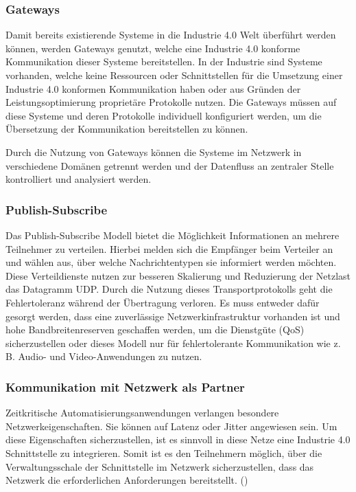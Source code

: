 \subsubsection{Gateways}
Damit bereits existierende Systeme in die Industrie 4.0 Welt überführt werden können, werden Gateways genutzt, welche eine Industrie 4.0 konforme Kommunikation dieser Systeme bereitstellen. In der Industrie sind Systeme vorhanden, welche keine Ressourcen oder Schnittstellen für die Umsetzung einer Industrie 4.0 konformen Kommunikation haben oder aus Gründen der Leistungsoptimierung proprietäre Protokolle nutzen. Die Gateways müssen auf diese Systeme und deren Protokolle individuell konfiguriert werden, um die Übersetzung der Kommunikation bereitstellen zu können.

Durch die Nutzung von Gateways können die Systeme im Netzwerk in verschiedene Domänen getrennt werden und der Datenfluss an zentraler Stelle kontrolliert und analysiert werden.

\subsubsection{Publish-Subscribe}
\label{Grundlagen:Publish-Subscribe}
Das Publish-Subscribe Modell bietet die Möglichkeit Informationen an mehrere Teilnehmer zu verteilen. Hierbei melden sich die Empfänger beim Verteiler an und wählen aus, über welche Nachrichtentypen sie informiert werden möchten. Diese Verteildienste nutzen zur besseren Skalierung und Reduzierung der Netzlast das Datagramm \ac{UDP}. Durch die Nutzung dieses Transportprotokolls geht die Fehlertoleranz während der Übertragung verloren. Es muss entweder dafür gesorgt werden, dass eine zuverlässige Netzwerkinfrastruktur vorhanden ist und hohe Bandbreitenreserven geschaffen werden, um die Dienstgüte (\ac{QoS}) sicherzustellen oder dieses Modell nur für fehlertolerante Kommunikation wie z. B. Audio- und Video-Anwendungen zu nutzen.

\subsubsection{Kommunikation mit Netzwerk als Partner}
Zeitkritische Automatisierungsanwendungen verlangen besondere Netzwerkeigenschaften. Sie können auf Latenz oder Jitter angewiesen sein. Um diese Eigenschaften sicherzustellen, ist es sinnvoll in diese Netze eine Industrie 4.0 Schnittstelle zu integrieren. Somit ist es den Teilnehmern möglich, über die Verwaltungsschale der Schnittstelle im Netzwerk sicherzustellen, dass das Netzwerk die erforderlichen Anforderungen bereitstellt. (\cite{sichKom2017})

